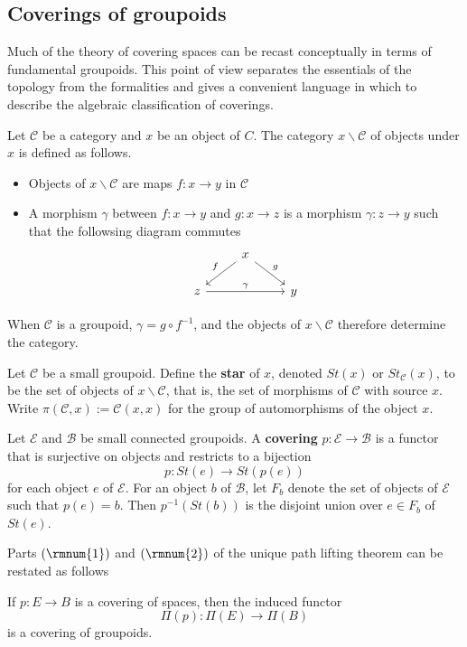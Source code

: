 \subsection{Coverings of groupoids}
Much of the theory of covering spaces can be recast conceptually in terms of
fundamental groupoids. This point of view separates the essentials of the topology from the formalities and gives a convenient language in which to describe the algebraic classification of coverings.
\begin{definition}
Let $\mathcal{C}$ be a category and $x$ be an object of $C$. The category
$x\backslash\mathcal{C}$ of objects under $x$ is defined as follows.
\begin{itemize}
\item Objects of $x\backslash\mathcal{C}$ are maps $f:x\to y$ in $\mathcal{C}$
\item A morphism $\gamma$ between $f:x\to y$ and $g:x\to z$ is a morphism $\gamma: z\to y$ such that the followsing diagram commutes
\[\begin{tikzcd}
&x\ar[ld,swap,"f"]\ar[rd,"g"]&\\
z\ar[rr,"\gamma"]&&y
\end{tikzcd}\]
\end{itemize}
When $\mathcal{C}$ is a groupoid, $\gamma=g\circ f^{-1}$, and the objects of $x\backslash\mathcal{C}$ therefore determine the category.
\end{definition}
\begin{definition}
Let $\mathcal{C}$ be a small groupoid. Define the \textbf{star} of $x$, denoted $St(x)$ or $St_{\mathcal{C}}(x)$, to be the set of objects of $x\backslash\mathcal{C}$, that is, the set of morphisms of $\mathcal{C}$ with source $x$. Write $\pi(\mathcal{C},x):=\mathcal{C}(x,x)$ for the group of automorphisms of the object $x$.
\end{definition}
\begin{definition}
Let $\mathcal{E}$ and $\mathcal{B}$ be small connected groupoids. A \textbf{covering} $p:\mathcal{E}\to\mathcal{B}$ is a functor that is surjective on objects and restricts to a bijection
\[p:St(e)\to St(p(e))\]
for each object $e$ of $\mathcal{E}$. For an object $b$ of $\mathcal{B}$, let $F_b$ denote the set of objects of $\mathcal{E}$ such that $p(e)=b$. Then $p^{-1}(St(b))$ is the disjoint union over $e\in F_b$ of $St(e)$.
\end{definition}
Parts $(\rmnum{1})$ and $(\rmnum{2})$ of the unique path lifting theorem can be restated as follows
\begin{proposition}
If $p:E\to B$ is a covering of spaces, then the induced functor \[\Pi(p):\Pi(E)\to\Pi(B)\]
is a covering of groupoids.
\end{proposition}
